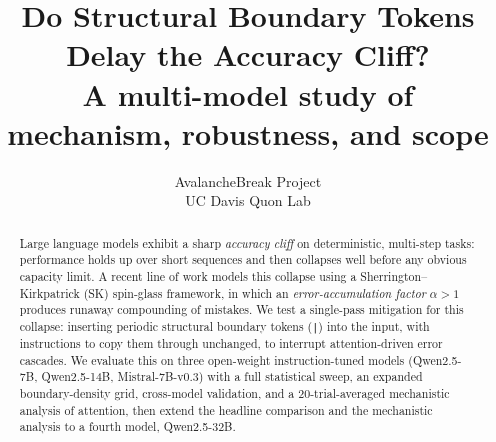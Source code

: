 \documentclass[11pt]{article}
\title{\textbf{Do Structural Boundary Tokens Delay the Accuracy Cliff?}\\[4pt]
\large A multi-model study of mechanism, robustness, and scope}
\author{AvalancheBreak Project \\ UC Davis Quon Lab}
\date{}
\begin{document}
\maketitle
\thispagestyle{fancy}

\begin{abstract}
\noindent
Large language models exhibit a sharp \emph{accuracy cliff} on deterministic, multi-step tasks: performance holds up over short sequences and then collapses well before any obvious capacity limit. A recent line of work models this collapse using a Sherrington--Kirkpatrick (SK) spin-glass framework, in which an \emph{error-accumulation factor} $\alpha > 1$ produces runaway compounding of mistakes. We test a single-pass mitigation for this collapse: inserting periodic structural boundary tokens (\texttt{|}) into the input, with instructions to copy them through unchanged, to interrupt attention-driven error cascades. We evaluate this on three open-weight instruction-tuned models (Qwen2.5-7B, Qwen2.5-14B, Mistral-7B-v0.3) with a full statistical sweep, an expanded boundary-density grid, cross-model validation, and a 20-trial-averaged mechanistic analysis of attention, then extend the headline comparison and the mechanistic analysis to a fourth model, Qwen2.5-32B.


\end{abstract}
\end{document}
